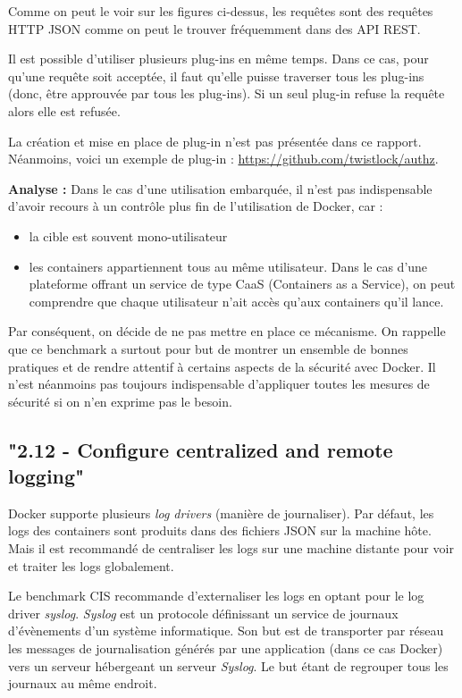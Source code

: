 \documentclass[11pt,a4paper,oneside]{report}
\begin{document}

Comme on peut le voir sur les figures ci-dessus, les requêtes sont des requêtes HTTP JSON comme on peut le trouver fréquemment dans des API REST.

Il est possible d'utiliser plusieurs plug-ins en même temps. Dans ce cas, pour qu'une requête soit acceptée, il faut qu'elle puisse traverser tous les plug-ins (donc, être approuvée par tous les plug-ins). Si un seul plug-in refuse la requête alors elle est refusée.

La création et mise en place de plug-in n'est pas présentée dans ce rapport. Néanmoins, voici un exemple de plug-in : \url{https://github.com/twistlock/authz}.

\textbf{Analyse : } Dans le cas d'une utilisation embarquée, il n'est pas indispensable d'avoir recours à un contrôle plus fin de l'utilisation de Docker, car :
\begin{itemize}
\item la cible est souvent mono-utilisateur
\item les containers appartiennent tous au même utilisateur. Dans le cas d'une plateforme offrant un service de type CaaS (Containers as a Service), on peut comprendre que chaque utilisateur n'ait accès qu'aux containers qu'il lance.
\end{itemize}
Par conséquent, on décide de ne pas mettre en place ce mécanisme. On rappelle que ce benchmark a surtout pour but de montrer un ensemble de bonnes pratiques et de rendre attentif à certains aspects de la sécurité avec Docker. Il n'est néanmoins pas toujours indispensable d'appliquer toutes les mesures de sécurité si on n’en exprime pas le besoin.


\subsection{"2.12 - Configure centralized and remote logging"}
Docker supporte plusieurs \textit{log drivers} (manière de journaliser). Par défaut, les logs des containers sont produits dans des fichiers JSON sur la machine hôte. Mais il est recommandé de centraliser les logs sur une machine distante pour voir et traiter les logs globalement.

Le benchmark CIS recommande d'externaliser les logs en optant pour le log driver \textit{syslog}. \textit{Syslog}\cite{developpez_syslog}\cite{wiki_syslog} est un protocole définissant un service de journaux d'évènements d'un système informatique. Son but est de transporter par réseau les messages de journalisation générés par une application (dans ce cas Docker) vers un serveur hébergeant un serveur \textit{Syslog}. Le but étant de regrouper tous les journaux au même endroit.
\end{document}
